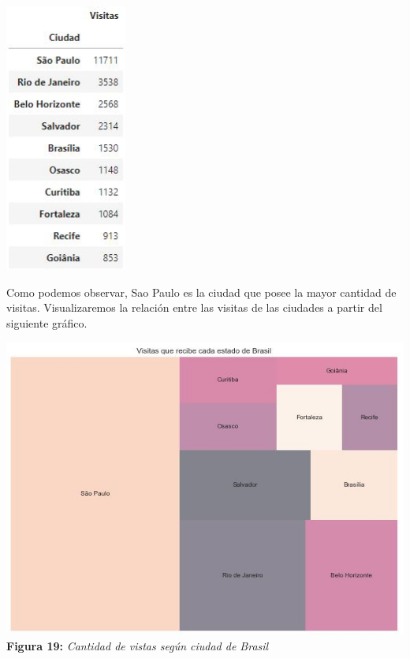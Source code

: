 \documentclass[titlepage,a4paper]{article}
\begin{document}
	\begin{center}
	\includegraphics[width=4cm] {tablaVisitasPorCiudad.jpg}\\
	\end{center}		
	
	Como podemos observar, Sao Paulo es la ciudad que posee la mayor cantidad de visitas. Visualizaremos la relación entre las visitas de las ciudades a partir del siguiente gráfico.	
	
	\begin{center}
	\includegraphics[width=15cm] {cantidadDeVisitasPorEstadoDeBrasil.jpg}\\
	\textbf{Figura 19:}  \textit{Cantidad de vistas según ciudad de Brasil}
	\end{center}	
	
\end{document}
